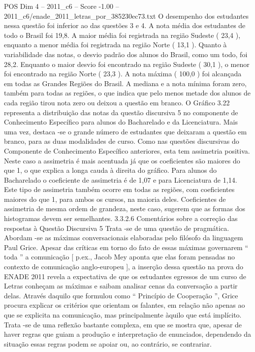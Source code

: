 \begin{textsample}{POS Dim 4 – 2011\_c6 – Score -1.00 – 2011\_c6/enade\_2011\_letras\_por\_385230ec73.txt}
O desempenho dos estudantes nessa questão foi inferior ao das questões 3 e 4.
A nota média dos estudantes de todo o Brasil foi 19,8.
A maior média foi registrada na região Sudeste ( 23,4 ), enquanto a menor média foi registrada na região Norte ( 13,1 ).
Quanto à variabilidade das notas, o desvio padrão dos alunos do Brasil, como um todo, foi 28,2.
Enquanto o maior desvio foi encontrado na região Sudeste ( 30,1 ), o menor foi encontrado na região Norte ( 23,3 ).
A nota máxima ( 100,0 ) foi alcançada em todas as Grandes Regiões do Brasil.
A mediana e a nota mínima foram zero, também para todas as regiões, o que indica que pelo menos metade dos alunos de cada região tirou nota zero ou deixou a questão em branco.
O Gráfico 3.22 representa a distribuição das notas da questão discursiva 5 no componente de Conhecimento Específico para alunos do Bacharelado e da Licenciatura.
Mais uma vez, destaca -se o grande número de estudantes que deixaram a questão em branco, para as duas modalidades de curso.
Como nas questões discursivas do Componente de Conhecimento Específico anteriores, esta tem assimetria positiva.
Neste caso a assimetria é mais acentuada já que os coeficientes são maiores do que 1, o que explica a longa cauda à direita do gráfico.
Para alunos do Bacharelado o coeficiente de assimetria é de 1,07 e para Licenciatura de 1,14.
Este tipo de assimetria também ocorre em todas as regiões, com coeficientes maiores do que 1, para ambos os cursos, na maioria deles.
Coeficientes de assimetria de mesma ordem de grandeza, neste caso, sugerem que as formas dos histogramas devem ser semelhantes. 3.3.2.6 Comentários sobre a correção das respostas à Questão Discursiva 5 Trata -se de uma questão de pragmática.
Abordam -se as máximas conversacionais elaboradas pelo filósofo da linguagem Paul Grice.
Apesar das críticas em torno do fato de essas máximas governarem “ toda ” a comunicação [ p.ex., Jacob Mey aponta que elas foram pensadas no contexto de comunicação anglo-europeu ], a inserção dessa questão na prova do ENADE 2011 revela a expectativa de que os estudantes egressos de um curso de Letras conheçam as máximas e saibam analisar cenas da conversação a partir delas.
Através daquilo que formulou como “ Princípio de Cooperação ”, Grice procura explicar os critérios que orientam os falantes, em relação não apenas ao que se explicita na comunicação, mas principalmente àquilo que está implícito.
Trata -se de uma reflexão bastante complexa, em que se mostra que, apesar de haver regras que guiam a produção e interpretação de enunciados, dependendo da situação essas regras podem se apoiar ou, ao contrário, se contrariar.

\end{textsample}
